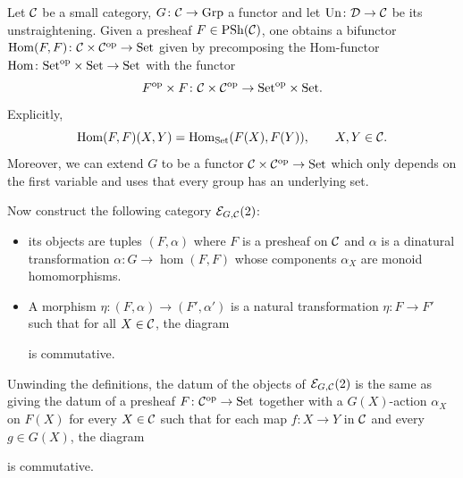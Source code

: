 \begin{construction}
Let $\mathcal{C}$ be a small category, $G\colon\mathcal{C}\to\mathrm{Grp}$ a functor and let $\mathrm{Un}\colon\mathcal{D}\to\mathcal{C}$ be its unstraightening.
Given a presheaf $F\in\operatorname{PSh}(\mathcal{C})$, one obtains a bifunctor $\operatorname{Hom}(F,F)\colon\mathcal{C}\times\mathcal{C}^{\mathrm{op}}\to\mathrm{Set}$ 
given by precomposing the Hom-functor $\operatorname{Hom}\colon\mathrm{Set}^{\mathrm{op}}\times\mathrm{Set}\to\mathrm{Set}$ with the functor
\[
    F^{\mathrm{op}}\times F\colon\mathcal{C}\times\mathcal{C}^{\mathrm{op}}\to\mathrm{Set}^{\mathrm{op}}\times\mathrm{Set}.
\]
Explicitly,
\[
    \operatorname{Hom}(F,F)(X,Y) = \operatorname{Hom}_{\mathrm{Set}}(F(X),F(Y)),\qquad X,Y\in\mathcal{C}.
\]
Moreover, we can extend $G$ to be a functor $\mathcal{C}\times\mathcal{C}^{\mathrm{op}}\to\mathrm{Set}$ which only depends on the first
variable and uses that every group has an underlying set.

Now construct the following category $\mathcal{E}_{G,\mathcal{C}}(2)$:
\begin{itemize}
    \item its objects are tuples $(F,\alpha)$ where $F$ is a presheaf on $\mathcal{C}$
        and $\alpha$ is a dinatural transformation $\alpha\colon G\to\hom(F,F)$
        whose components $\alpha_X$ are monoid homomorphisms.
	\item A morphism $\eta\colon (F,\alpha)\to(F',\alpha')$ is a natural transformation $\eta\colon F\to F'$
        such that for all $X\in\mathcal{C}$, the diagram
\begin{center}
\end{center}
is commutative.
\end{itemize}
Unwinding the definitions, the datum of the objects of $\mathcal{E}_{G,\mathcal{C}}(2)$ is the same
as giving the datum of a presheaf $F\colon\mathcal{C}^{\mathrm{op}}\to\mathrm{Set}$ together with a
$G(X)$-action $\alpha_X$ on $F(X)$ for every $X\in\mathcal{C}$ such that for each map $f\colon X\to Y$ in $\mathcal{C}$ and every $g\in G(X)$,
the diagram
\begin{center}
\end{center}
is commutative.
\end{construction}

